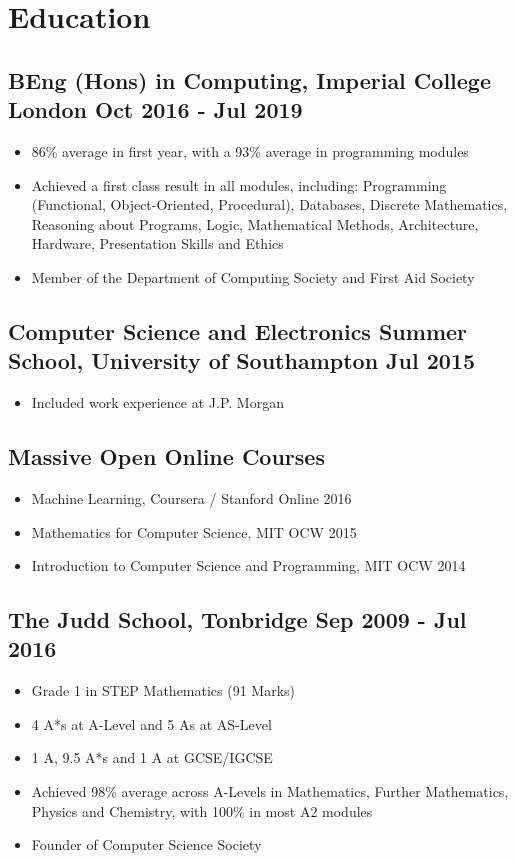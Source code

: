 \documentclass[a4paper, 8pt]{extarticle}
\begin{document}
\begin{minipage}[t]{.66\textwidth}

\section*{Education}

\subsection*{BEng (Hons) in Computing, Imperial College London \hfill Oct 2016 - Jul 2019}
\begin{itemize}
	\item 86\% average in first year, with a 93\% average in programming modules
	\item Achieved a first class result in all modules, including: Programming (Functional, Object-Oriented, Procedural), Databases, Discrete Mathematics, Reasoning about Programs, Logic, Mathematical Methods, Architecture, Hardware, Presentation Skills and Ethics
	\item Member of the Department of Computing Society and First Aid Society
\end{itemize}

\subsection*{Computer Science and Electronics Summer School, University of Southampton \hfill Jul 2015}
\begin{itemize}
	\item Included work experience at J.P. Morgan
\end{itemize}

\subsection*{Massive Open Online Courses}
\begin{itemize}
	\item Machine Learning, Coursera / Stanford Online \hfill 2016
	\item Mathematics for Computer Science, MIT OCW \hfill 2015
	\item Introduction to Computer Science and Programming, MIT OCW \hfill 2014
\end{itemize}

\subsection*{The Judd School, Tonbridge \hfill Sep 2009 - Jul 2016}
\begin{itemize}
	\item Grade 1 in STEP Mathematics (91 Marks)
	\item 4 A*s at A-Level and 5 As at AS-Level
	\item 1 A$\hat{}$, 9.5 A*s and 1 A at GCSE/IGCSE
	\item Achieved 98\% average across A-Levels in Mathematics, Further Mathematics, Physics and Chemistry, with 100\% in most A2 modules
	\item Founder of Computer Science Society
\end{itemize}



\end{minipage}
\end{document}
